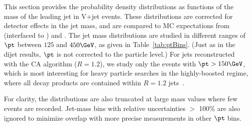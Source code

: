 
\label{sec:vjetresults}

This section provides the probability density distributions as functions of
the mass of the leading jet in V+jet events. These distributions are
corrected for detector effects in the jet mass, and are compared to MC expectations
from \MADGRAPH (interfaced to \PYTHIA) and \HERWIG.  
The jet mass distributions are studied in different ranges of $\pt$
between $125$ and $450\GeV$, as given in Table~\ref{tab:ptBins}. 
(Just as in
the dijet results, $\pt$
is not corrected to the particle level.) For
jets reconstructed with the CA algorithm ($R=1.2$), we study only the
events with
$\pt>150\GeV$, which is most interesting for
heavy particle searches in the highly-boosted regime, where all decay
products are contained within $R=1.2$ jets~\cite{boostedHiggs}. 

For clarity, the distributions are also truncated at large mass values where few events are recorded.
 Jet-mass bins with relative uncertainties 
$>$ 100\% are also ignored to minimize overlap with more precise measurements in other $\pt$ bins.




